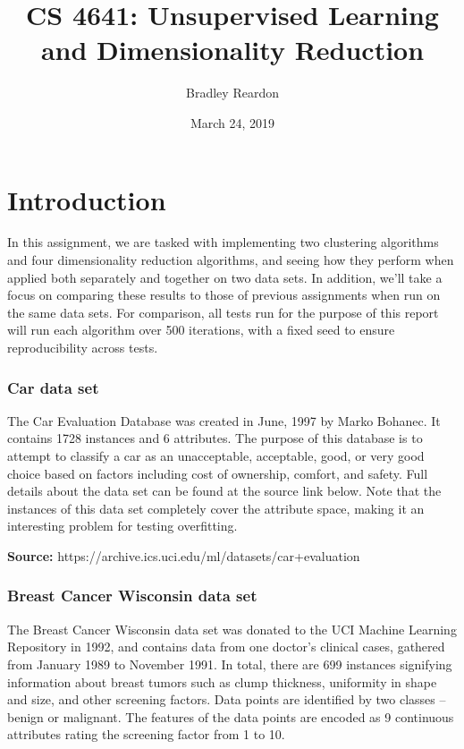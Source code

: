 \documentclass{article}
\title{\textbf{CS 4641:} Unsupervised Learning and Dimensionality Reduction}
\author{Bradley Reardon}
\date{March 24, 2019}
\begin{document}
  \maketitle

  \section{Introduction}
    In this assignment, we are tasked with implementing two clustering algorithms and four dimensionality reduction algorithms, and seeing how they perform when applied both separately and together on two data sets. In addition, we'll take a focus on comparing these results to those of previous assignments when run on the same data sets. For comparison, all tests run for the purpose of this report will run each algorithm over 500 iterations, with a fixed seed to ensure reproducibility across tests.

    \subsubsection{Car data set}
      The Car Evaluation Database was created in June, 1997 by Marko Bohanec. It contains 1728 instances and 6 attributes. The purpose of this database is to attempt to classify a car as an unacceptable, acceptable, good, or very good choice based on factors including cost of ownership, comfort, and safety. Full details about the data set can be found at the source link below. Note that the instances of this data set completely cover the attribute space, making it an interesting problem for testing overfitting.

      \textbf{Source:} https://archive.ics.uci.edu/ml/datasets/car+evaluation

    \subsubsection{Breast Cancer Wisconsin data set}
      The Breast Cancer Wisconsin data set was donated to the UCI Machine Learning Repository in 1992, and contains data from one doctor's clinical cases, gathered from January 1989 to November 1991. In total, there are 699 instances signifying information about breast tumors such as clump thickness, uniformity in shape and size, and other screening factors. Data points are identified by two classes -- benign or malignant. The features of the data points are encoded as 9 continuous attributes rating the screening factor from 1 to 10.
\end{document}
